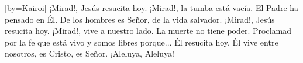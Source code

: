 [by={Kairoi}]
\beginverse
¡Mirad!, Jesús resucita hoy.  
¡Mirad!, la tumba está vacía. 
El Padre ha pensado en Él.  
De los hombres es Señor, 
de la vida salvador.
¡Mirad!, Jesús resucita hoy.  
¡Mirad!, vive a nuestro lado.  
La muerte no tiene poder.  
Proclamad por la fe 
que está vivo y somos libres porque...
\endverse
\beginchorus
Él resucita hoy,
Él vive entre nosotros,
es Cristo, es Señor.
¡Aleluya, Aleluya! 
\endchorus
\endsong